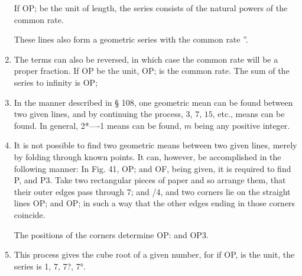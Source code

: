 \begin{enumerate}
%
%


    If OP; be the unit of length, the series consists of the natural powers of
    the common rate.


%
%
These lines also form a geometric series with the common rate ”.


\item The terms can also be reversed, in which case the common rate will be a
    proper fraction. If OP be the unit, OP; is the common rate. The sum of the
    series to infinity is OP;



\item In the manner described in § 108, one geometric mean can be found between
    two given lines, and by continuing the process, $3$, $7$, $15$, etc., means
    can be found. In general, 2*—-1 means can be found, $m$ being any positive
    integer.


\item It is not possible to find two geometric means between two given lines,
    merely by folding through known points. It can, however, be accomplished in
    the following manner: In Fig. 41, OP; and OF, being given, it is required to
    find P, and P3. Take two rectangular pieces of paper and so arrange them,
    that their outer edges pass through 7; and /4, and two corners lie on the
    straight lines OP; and OP; in such a way that the other edges ending in
    those corners coincide.

    The positions of the corners determine OP: and OP3.


\item This process gives the cube root of a given number, for if OP, is the
    unit, the series is 1, 7, 7?, 7°.



\end{enumerate}
